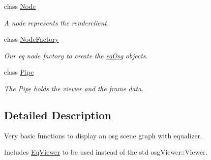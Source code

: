 \begin{CompactItemize}
class \hyperlink{a00012}{Node}
\begin{CompactList}\small\item\em A node represents the renderclient. \item\end{CompactList}\item 
class \hyperlink{a00013}{NodeFactory}
\begin{CompactList}\small\item\em Our eq node factory to create the \hyperlink{a00044}{eqOsg} objects. \item\end{CompactList}\item 
class \hyperlink{a00014}{Pipe}
\begin{CompactList}\small\item\em The \hyperlink{a00014}{Pipe} holds the viewer and the frame data. \item\end{CompactList}\end{CompactItemize}


\subsection{Detailed Description}
Very basic functions to display an osg scene graph with equalizer. 

Includes \hyperlink{a00009}{EqViewer} to be used instead of the std osgViewer::Viewer. 


